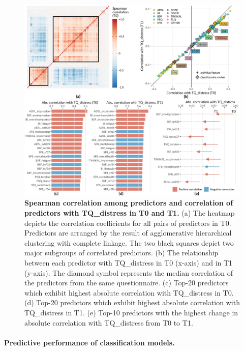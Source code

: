 \documentclass[
  oneside]{book}
\begin{document}
\begin{figure}[htbp]

{\centering \includegraphics[width=1\linewidth]{figures/09-cor} 

}

\caption{\textbf{Spearman correlation among predictors and correlation of predictors with TQ\_distress in T0 and T1.} (a) The heatmap depicts the correlation coefficients for all pairs of predictors in T0. Predictors are arranged by the result of agglomerative hierarchical clustering with complete linkage. The two black squares depict two major subgroups of correlated predictors. (b) The relationship between each predictor with TQ\_distress in T0 (x-axis) and in T1 (y-axis). The diamond symbol represents the median correlation of the predictors from the same questionnaire. (c) Top-20 predictors which exhibit highest absolute correlation with TQ\_distress in T0. (d) Top-20 predictors which exhibit highest absolute correlation with TQ\_distress in T1. (e) Top-10 predictors with the highest change in absolute correlation with TQ\_distress from T0 to T1.}\label{fig:09-cor}
\end{figure}

\paragraph*{Predictive performance of classification models.}
\end{document}
